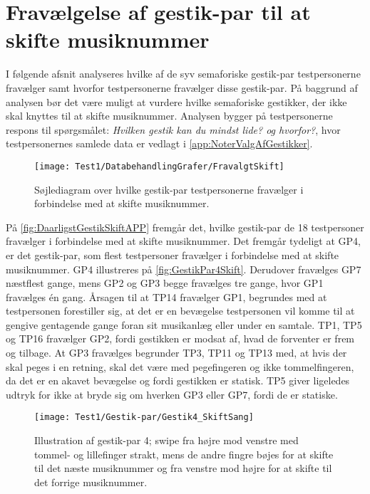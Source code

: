 \section{Fravælgelse af gestik-par til at skifte musiknummer}
\label{app:TestresultaterSkiftDaarlig}
%
I følgende afsnit analyseres hvilke af de syv semaforiske gestik-par testpersonerne fravælger samt hvorfor testpersonerne fravælger disse gestik-par. På baggrund af analysen bør det være muligt at vurdere hvilke semaforiske gestikker, der ikke skal knyttes til at skifte musiknummer. Analysen bygger på testpersonerne respons til spørgsmålet: \textit{Hvilken gestik kan du mindst lide? og hvorfor?}, hvor testpersonernes samlede data er vedlagt i \autoref{app:NoterValgAfGestikker}.
%
\begin{figure}[H]
	\centering
	\texttt{[image: Test1/DatabehandlingGrafer/FravalgtSkift]}
	\caption{Søjlediagram over hvilke gestik-par testpersonerne fravælger i forbindelse med at skifte musiknummer.}
	\label{fig:DaarligstGestikSkiftAPP}
\end{figure}
\noindent
%
På \autoref{fig:DaarligstGestikSkiftAPP} fremgår det, hvilke gestik-par de 18 testpersoner fravælger i forbindelse med at skifte musiknummer. Det fremgår tydeligt at GP4, er det gestik-par, som flest testpersoner fravælger i forbindelse med at skifte musiknummer. GP4 illustreres på \autoref{fig:GestikPar4Skift}. Derudover fravælges GP7 næstflest gange, mens GP2 og GP3 begge fravælges tre gange, hvor GP1 fravælges én gang. Årsagen til at TP14 fravælger GP1, begrundes med at testpersonen forestiller sig, at det er en bevægelse testpersonen vil komme til at gengive gentagende gange foran sit musikanlæg eller under en samtale. TP1, TP5 og TP16 fravælger GP2, fordi gestikken er modsat af, hvad de forventer er frem og tilbage. At GP3 fravælges begrunder TP3, TP11 og TP13 med, at hvis der skal peges i en retning, skal det være med pegefingeren og ikke tommelfingeren, da det er en akavet bevægelse og fordi gestikken er statisk. TP5 giver ligeledes udtryk for ikke at bryde sig om hverken GP3 eller GP7, fordi de er statiske.
%
\begin{figure}[H]
	\centering
	\texttt{[image: Test1/Gestik-par/Gestik4\_SkiftSang]}
	\caption{Illustration af gestik-par 4; swipe fra højre mod venstre med tommel- og lillefinger strakt, mens de andre fingre bøjes for at skifte til det næste musiknummer og fra venstre mod højre for at skifte til det forrige musiknummer.}
	\label{fig:GestikPar4Skift}
\end{figure}
